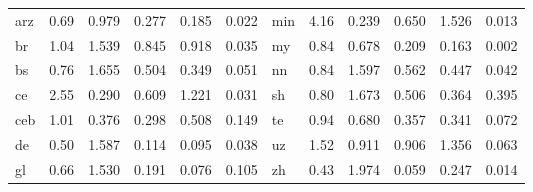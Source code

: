 \begin{table}[tbp]
\begin{tabular}{@{}lccccc@{\hspace{14pt}}lccccc@{}}
arz & 0.69 & 0.979 & 0.277 & 0.185 & 0.022 & min & 4.16 & 0.239 & 0.650 & 1.526 & 0.013 \\
br & 1.04 & 1.539 & 0.845 & 0.918 & 0.035 & my & 0.84 & 0.678 & 0.209 & 0.163 & 0.002 \\
bs & 0.76 & 1.655 & 0.504 & 0.349 & 0.051 & nn & 0.84 & 1.597 & 0.562 & 0.447 & 0.042 \\
ce & 2.55 & 0.290 & 0.609 & 1.221 & 0.031 & sh & 0.80 & 1.673 & 0.506 & 0.364 & 0.395 \\
ceb & 1.01 & 0.376 & 0.298 & 0.508 & 0.149 & te & 0.94 & 0.680 & 0.357 & 0.341 & 0.072 \\
de & 0.50 & 1.587 & 0.114 & 0.095 & 0.038 & uz & 1.52 & 0.911 & 0.906 & 1.356 & 0.063 \\
gl & 0.66 & 1.530 & 0.191 & 0.076 & 0.105 & zh & 0.43 & 1.974 & 0.059 & 0.247 & 0.014 \\
\bottomrule
\end{tabular}
\end{table}
